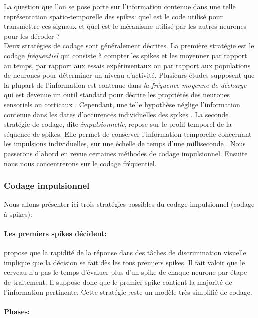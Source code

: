 La question que l'on se pose porte sur l'information contenue dans une telle représentation spatio-temporelle des spikes: quel est le code utilisé pour transmettre ces signaux et quel est le mécanisme utilisé par les autres neurones pour les décoder ?\\

Deux stratégies de codage sont généralement décrites. La première stratégie est le codage \textit{fréquentiel} qui consiste à compter les spikes et les moyenner par rapport au temps, par rapport aux essais expérimentaux ou par rapport aux populations de neurones pour déterminer un niveau d'activité. Plusieurs études supposent que la plupart de l'information est contenue dans \textit{la fréquence moyenne de décharge} qui est devenue un outil standard pour décrire les propriétés des neurones sensoriels ou corticaux \cite{Mountcastle:1957, Hubel:1959}. Cependant, une telle hypothèse néglige l'information contenue dans les dates d'occurences individuelles des spikes \cite{Oram:1999, Abeles:1994, Hopfield:1995, Bialek:1991, Shadlen:1994, Rieke:1996}. La seconde stratégie de codage, dite \textit{impulsionnelle}, repose sur le profil temporel de la séquence de spikes. Elle permet de conserver l'information temporelle concernant les impulsions individuelles, sur une échelle de temps d'une milliseconde \cite{Rieke:1997}. Nous passerons d'abord en revue certaines méthodes de codage impulsionnel. Ensuite nous nous concentrerons sur le codage fréquentiel. 


\subsubsection{Codage impulsionnel}
Nous allons présenter ici trois stratégies possibles du codage impulsionnel (codage à spikes): 
\paragraph{Les premiers spikes décident:}

\cite{Thorpe:1996} propose que la rapidité de la réponse dans des tâches de discrimination visuelle implique que la décision se fait dès les tous premiers spikes. Il fait valoir que le cerveau n'a pas le temps d'évaluer plus d'un spike de chaque neurone par étape de traitement. Il suppose donc que le premier spike contient la majorité de l'information pertinente. Cette stratégie reste un modèle très simplifié de codage.


\paragraph{Phases:}

